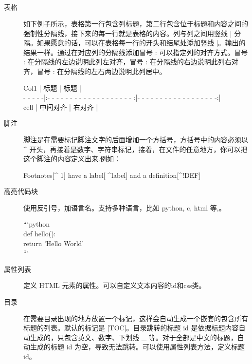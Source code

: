 \subsection{}
\label{sec:smarkdownextr}

\begin{description}
\item[表格] 如下例子所示，表格第一行包含列标题，第二行包含位于标题和内容之间的强制性分隔线，接下来的每一行就是表格的内容。列与列之间用竖线 | 分隔。如果愿意的话，可以在表格每一行的开头和结尾处添加竖线 |。输出的结果一样。通过在对应列的分隔线添加冒号 : 可以指定列的对齐方式。冒号 : 在分隔线的左边说明此列左对齐，冒号 : 在分隔线的右边说明此列右对齐，冒号 : 在分隔线的左右两边说明此列居中。
  \begin{bframe}
    Col1     |                  标题                   |               标题                  |\\
    - - - - -|:- - - - - - - - - - - - - - - - - - - :|- - - - - - - - - - - - - - - - - -:|\\
    cell     |                中间对齐                 |              右对齐                 |\\
  \end{bframe}
\item[脚注] 脚注是在需要标记脚注文字的后面增加一个方括号，方括号中的内容必须以  \^{} 开头，再接着是数字、字符串标记，接着，在文件的任意地方，你可以把这个脚注的内容定义出来.例如：
  \begin{bframe}
    Footnotes[\^{} 1] have a label[ \^{}label] and a definition[\^{}!DEF]\\
  \end{bframe}
\item[高亮代码块] 使用反引号，加语言名。支持多种语言，比如 python, c, html 等,。
  \begin{bframe}
    ```python\\
   def hello():\\
    return 'Hello World'\\
    ```\\
  \end{bframe}
\item[属性列表] 定义 HTML 元素的属性。可以自定义文本内容的id和css类。
\item[目录] 在需要目录出现的地方放置一个标记，这样会自动生成一个嵌套的包含所有标题的列表。默认的标记是 [TOC]。目录跳转的标题 id 是依据标题内容自动生成的，只包含英文、数字、下划线 \_ 等。对于全部是中文的标题，自动生成的标题 id 为空，导致无法跳转。可以使用属性列表方法，定义标题 id。
\end{description}

